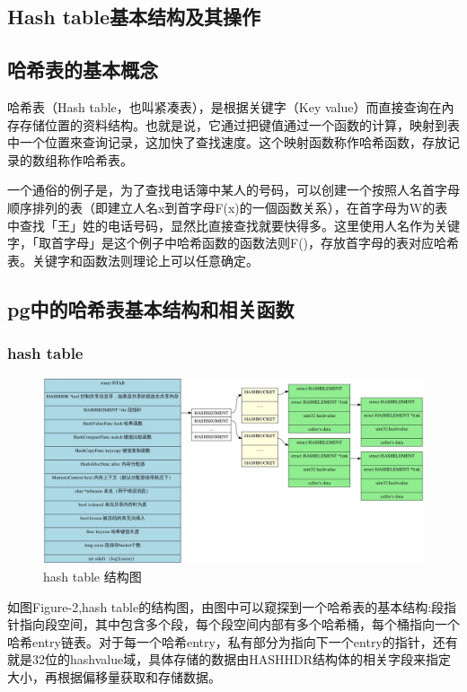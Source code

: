 \documentclass{article}
\begin{document}
\begin{CJK*}{UTF8}{gkai}
\section{Hash table基本结构及其操作} 
\subsection{哈希表的基本概念}
\indent 哈希表（Hash table，也叫紧凑表），是根据关键字（Key value）而直接查询在內存存储位置的资料结构。也就是说，它通过把键值通过一个函数的计算，映射到表中一个位置來查询记录，这加快了查找速度。这个映射函数称作哈希函数，存放记录的数组称作哈希表。

\indent 一个通俗的例子是，为了查找电话簿中某人的号码，可以创建一个按照人名首字母顺序排列的表（即建立人名x到首字母F(x)的一個函数关系），在首字母为W的表中查找「王」姓的电话号码，显然比直接查找就要快得多。这里使用人名作为关键字，「取首字母」是这个例子中哈希函数的函数法则F()，存放首字母的表对应哈希表。关键字和函数法则理论上可以任意确定。
\subsection{pg中的哈希表基本结构和相关函数}
\subsubsection{hash table}
\begin{figure}[H]
\begin{center}
\includegraphics[width=1.0\textwidth]{hash.jpg}
\caption{hash table 结构图}
\end{center}
\end{figure}

\indent 如图Figure-2,hash table的结构图，由图中可以窥探到一个哈希表的基本结构:段指针指向段空间，其中包含多个段，每个段空间内部有多个哈希桶，每个桶指向一个哈希entry链表。对于每一个哈希entry，私有部分为指向下一个entry的指针，还有就是32位的hashvalue域，具体存储的数据由HASHHDR结构体的相关字段来指定大小，再根据偏移量获取和存储数据。


\end{CJK*}
\end{document}
